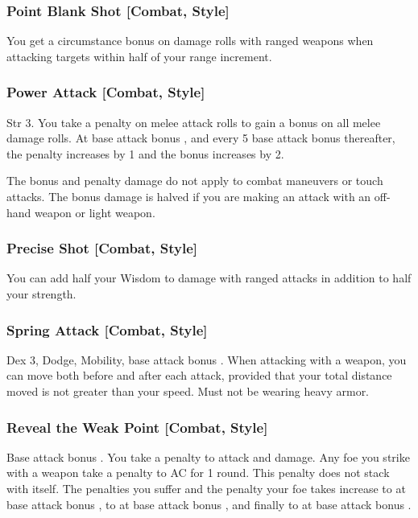 \subsubsection{Point Blank Shot [Combat, Style]}
 You get a  circumstance bonus on damage rolls with ranged weapons when attacking targets within half of your range increment. \babscalingdescription

\subsubsection{Power Attack [Combat, Style]}
 Str 3.
 You take a  penalty on melee attack rolls to gain a  bonus on all melee damage rolls. At base attack bonus , and every 5 base attack bonus thereafter, the penalty increases by 1 and the bonus increases by 2.
\par The bonus and penalty damage do not apply to combat maneuvers or touch attacks. The bonus damage is halved if you are making an attack with an off-hand weapon or light weapon.

\subsubsection{Precise Shot [Combat, Style]}
 You can add half your Wisdom to damage with ranged attacks in addition to half your strength.

\subsubsection{Spring Attack [Combat, Style]}
 Dex 3, Dodge, Mobility, base attack bonus .
 When attacking with a weapon, you can move both before and after each attack, provided that your total distance moved is not greater than your speed.
 Must not be wearing heavy armor.

\subsubsection{Reveal the Weak Point [Combat, Style]}
\featpre Base attack bonus .
 You take a  penalty to attack and damage. Any foe you strike with a weapon take a  penalty to AC for 1 round. This penalty does not stack with itself. The penalties you suffer and the penalty your foe takes increase to  at base attack bonus , to  at base attack bonus , and finally to  at base attack bonus .

